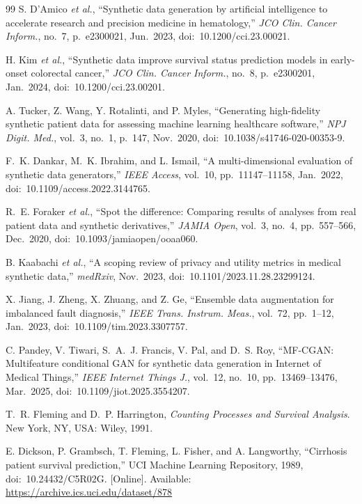 \documentclass[journal]{IEEEtran}
\begin{document}
\begin{thebibliography}{99}
S. D'Amico \textit{et al.}, ``Synthetic data generation by artificial intelligence to accelerate research and precision medicine in hematology,'' \textit{JCO Clin. Cancer Inform.}, no.~7, p.~e2300021, Jun.~2023, doi:~10.1200/cci.23.00021.

H. Kim \textit{et al.}, ``Synthetic data improve survival status prediction models in early-onset colorectal cancer,'' \textit{JCO Clin. Cancer Inform.}, no.~8, p.~e2300201, Jan.~2024, doi:~10.1200/cci.23.00201.

A. Tucker, Z. Wang, Y. Rotalinti, and P. Myles, ``Generating high-fidelity synthetic patient data for assessing machine learning healthcare software,'' \textit{NPJ Digit. Med.}, vol.~3, no.~1, p.~147, Nov.~2020, doi:~10.1038/s41746-020-00353-9.

F.~K. Dankar, M.~K. Ibrahim, and L. Ismail, ``A multi-dimensional evaluation of synthetic data generators,'' \textit{IEEE Access}, vol.~10, pp.~11147--11158, Jan.~2022, doi:~10.1109/access.2022.3144765.

R.~E. Foraker \textit{et al.}, ``Spot the difference: Comparing results of analyses from real patient data and synthetic derivatives,'' \textit{JAMIA Open}, vol.~3, no.~4, pp.~557--566, Dec.~2020, doi:~10.1093/jamiaopen/ooaa060.

B. Kaabachi \textit{et al.}, ``A scoping review of privacy and utility metrics in medical synthetic data,'' \textit{medRxiv}, Nov.~2023, doi:~10.1101/2023.11.28.23299124.

X. Jiang, J. Zheng, X. Zhuang, and Z. Ge, ``Ensemble data augmentation for imbalanced fault diagnosis,'' \textit{IEEE Trans. Instrum. Meas.}, vol.~72, pp.~1--12, Jan.~2023, doi:~10.1109/tim.2023.3307757.

C. Pandey, V. Tiwari, S.~A.~J. Francis, V. Pal, and D.~S. Roy, ``MF-CGAN: Multifeature conditional GAN for synthetic data generation in Internet of Medical Things,'' \textit{IEEE Internet Things J.}, vol.~12, no.~10, pp.~13469--13476, Mar.~2025, doi:~10.1109/jiot.2025.3554207.

T.~R. Fleming and D.~P. Harrington, \textit{Counting Processes and Survival Analysis}. New York, NY, USA: Wiley, 1991.

E. Dickson, P. Grambsch, T. Fleming, L. Fisher, and A. Langworthy, ``Cirrhosis patient survival prediction,'' UCI Machine Learning Repository, 1989, doi:~10.24432/C5R02G. [Online]. Available: \url{https://archive.ics.uci.edu/dataset/878}


\end{thebibliography}
\end{document}
